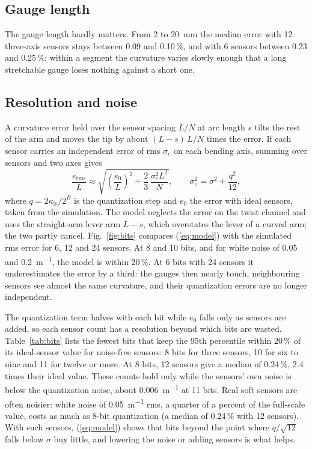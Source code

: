 \documentclass[conference]{IEEEtran}
\begin{document}
\subsection{Gauge length}

The gauge length hardly matters. From 2 to \SI{20}{mm} the median error with
12 three-axis sensors stays between 0.09 and 0.10\,\%, and with 6 sensors
between 0.23 and 0.25\,\%: within a segment the curvature varies slowly
enough that a long stretchable gauge loses nothing against a short one.

\subsection{Resolution and noise}

A curvature error held over the sensor spacing $L/N$ at arc length $s$
tilts the rest of the arm and moves the tip by about $(L-s)\,L/N$ times the
error. If each sensor carries an independent error of rms $\sigma_e$ on each
bending axis, summing over sensors and two axes gives
\begin{equation}
\frac{e_{\mathrm{rms}}}{L} \approx
\sqrt{\left(\frac{e_0}{L}\right)^{2} + \frac{2}{3}\,\frac{\sigma_e^{2} L^{2}}{N}},
\qquad \sigma_e^2 = \sigma^2 + \frac{q^2}{12},
\label{eq:model}
\end{equation}
where $q = 2\kappa_{\mathrm{fs}}/2^B$ is the quantization step and $e_0$ the
error with ideal sensors, taken from the simulation. The model neglects the
error on the twist channel and uses the straight-arm lever arm $L - s$,
which overstates the lever of a curved arm; the two partly cancel.
Fig.~\ref{fig:bits} compares (\ref{eq:model}) with the simulated rms error
for 6, 12 and 24 sensors. At 8 and 10 bits, and for white noise of 0.05 and
\SI{0.2}{m^{-1}}, the model is within 20\,\%. At 6 bits with 24 sensors it
underestimates the error by a third: the gauges then nearly touch,
neighbouring sensors see almost the same curvature, and their quantization
errors are no longer independent.

The quantization term halves with each bit while $e_0$ falls only as sensors
are added, so each sensor count has a resolution beyond which bits are
wasted. Table~\ref{tab:bits} lists the fewest bits that keep the 95th
percentile within 20\,\% of its ideal-sensor value for noise-free sensors:
8 bits for three sensors, 10 for six to nine and 11 for twelve or more. At
8 bits, 12 sensors give a median of 0.24\,\%, 2.4 times their ideal value.
These counts hold only while the sensors' own noise is below the
quantization noise, about \SI{0.006}{m^{-1}} at 11 bits. Real soft sensors
are often noisier: white noise of \SI{0.05}{m^{-1}} rms, a quarter of a
percent of the full-scale value, costs as much as 8-bit quantization (a
median of 0.24\,\% with 12 sensors). With such sensors, (\ref{eq:model})
shows that bits beyond the point where $q/\sqrt{12}$ falls below $\sigma$
buy little, and lowering the noise or adding sensors is what helps.
\end{document}
